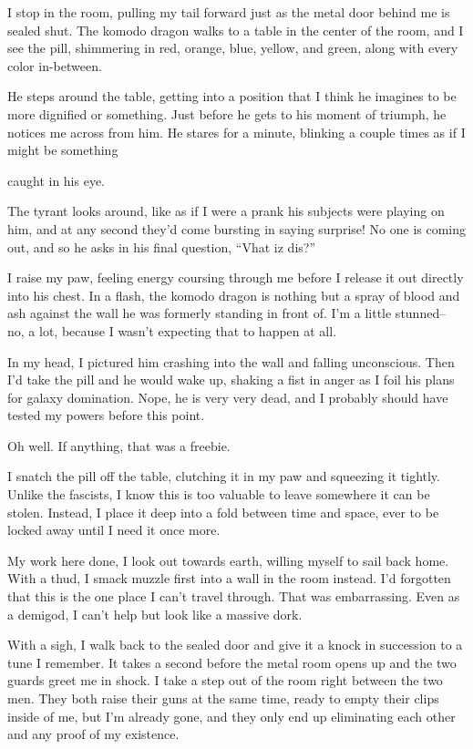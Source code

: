I stop in the room, pulling my tail forward just as the metal door
behind me is sealed shut. The komodo dragon walks to a table in the
center of the room, and I see the pill, shimmering in red, orange, blue,
yellow, and green, along with every color in-between.

He steps around the table, getting into a position that I think he
imagines to be more dignified or something. Just before he gets to his
moment of triumph, he notices me across from him. He stares for a
minute, blinking a couple times as if I might be something

caught in his eye.

The tyrant looks around, like as if I were a prank his subjects were
playing on him, and at any second they'd come bursting in saying
surprise! No one is coming out, and so he asks in his final question,
``Vhat iz dis?''

I raise my paw, feeling energy coursing through me before I release it
out directly into his chest. In a flash, the komodo dragon is nothing
but a spray of blood and ash against the wall he was formerly standing
in front of. I'm a little stunned-- no, a lot, because I wasn't
expecting that to happen at all.

In my head, I pictured him crashing into the wall and falling
unconscious. Then I'd take the pill and he would wake up, shaking a fist
in anger as I foil his plans for galaxy domination. Nope, he is very
very dead, and I probably should have tested my powers before this
point.

Oh well. If anything, that was a freebie.

I snatch the pill off the table, clutching it in my paw and squeezing it
tightly. Unlike the fascists, I know this is too valuable to leave
somewhere it can be stolen. Instead, I place it deep into a fold between
time and space, ever to be locked away until I need it once more.

My work here done, I look out towards earth, willing myself to sail back
home. With a thud, I smack muzzle first into a wall in the room instead.
I'd forgotten that this is the one place I can't travel through. That
was embarrassing. Even as a demigod, I can't help but look like a
massive dork.

With a sigh, I walk back to the sealed door and give it a knock in
succession to a tune I remember. It takes a second before the metal room
opens up and the two guards greet me in shock. I take a step out of the
room right between the two men. They both raise their guns at the same
time, ready to empty their clips inside of me, but I'm already gone, and
they only end up eliminating each other and any proof of my existence.


